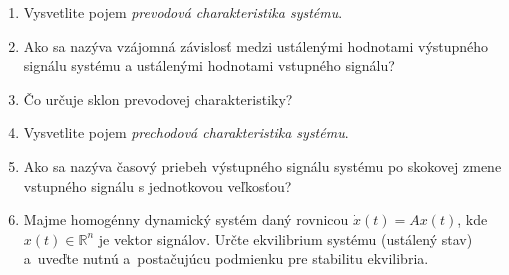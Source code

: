 \documentclass[a4paper, 10pt, ]{article}
\begin{document}
\begin{enumerate}[leftmargin=0pt, labelsep=3mm, itemsep=0pt]

    
    \item Vysvetlite pojem \emph{prevodová charakteristika systému}.

    \item Ako sa nazýva vzájomná závislosť medzi ustálenými hodnotami výstupného signálu systému a ustálenými hodnotami vstupného signálu?

    \item Čo určuje sklon prevodovej charakteristiky?


    \item Vysvetlite pojem \emph{prechodová charakteristika systému}.

    \item Ako sa nazýva časový priebeh výstupného signálu systému po skokovej zmene vstupného signálu s jednotkovou veľkosťou?

    \item Majme homogénny dynamický systém daný rovnicou $ \dot x(t) = A x(t) $, kde $x(t) \in \mathbb R^n$ je vektor signálov. Určte ekvilibrium systému (ustálený stav) a~uveďte nutnú a~postačujúcu podmienku pre stabilitu ekvilibria.



\end{enumerate}







\end{document}
